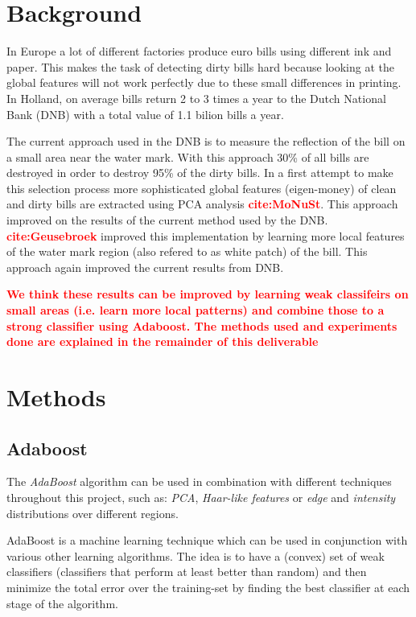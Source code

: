 \documentclass[11pt,twocolumn]{article}
\newcommand{\todo}[1]{\textcolor{red}{\textbf{#1}}}
\begin{document}
	\section{Background}\label{sec:Background}
		In Europe a lot of different factories produce euro bills using different ink and paper. This makes the task of detecting dirty bills hard because looking at the global features will not work perfectly due to these small differences in printing. In Holland, on average bills return 2 to 3 times a year to the Dutch National Bank (DNB) with a total value of 1.1 bilion bills a year. 

		The current approach used in the DNB is to measure the reflection of the bill on a small area near the water mark. With this approach 30\% of all bills are destroyed in order to destroy 95\% of the dirty bills. In a first attempt to make this selection process more		sophisticated global features (eigen-money) of clean and dirty bills are extracted using PCA analysis \todo{cite:MoNuSt}. This approach improved on the results of the current method used by the DNB. \todo{cite:Geusebroek} improved this implementation by learning more local features of the water mark region (also refered to as white patch) of the bill. This approach again improved the current results from DNB.
		
		\hspace*{10px}\todo{We think these results can be improved by learning weak
		classifeirs on small areas (i.e. learn more local patterns) and combine those
		to a strong classifier using Adaboost. The methods used and experiments done
		are explained in the remainder of this deliverable}
	
	\section{Methods}\label{sec:Methods}
		\subsection{Adaboost}\label{sec:Adaboost}
			The \emph{AdaBoost} algorithm can be used in combination with different techniques throughout this project, such as: \emph{PCA}, \emph{Haar-like features} or \emph{edge} and \emph{intensity} distributions over different regions.
			
			AdaBoost is a machine learning technique which can be used in conjunction with various other learning algorithms. The idea is to have a (convex) set of weak classifiers (classifiers that perform at least better than random) and then minimize the total error over the training-set by finding the best classifier at each stage of the algorithm.
\end{document}

